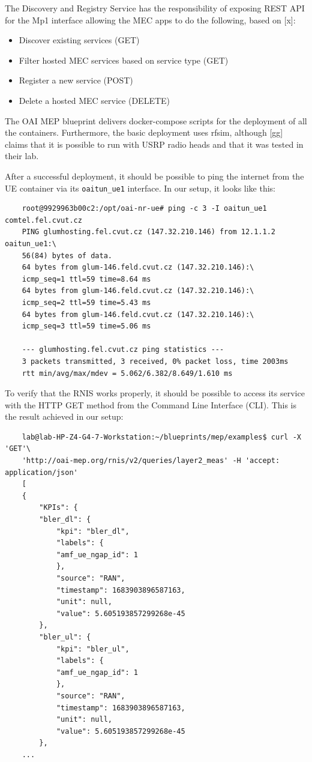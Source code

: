\documentclass[12pt,a4paper,twoside]{report}
\begin{document}
The Discovery and Registry Service has the responsibility of exposing REST API for the Mp1 interface allowing the MEC apps to do the following, based on [x]:
\begin{itemize}
	\item Discover existing services (GET)
	\item Filter hosted MEC services based on service type (GET)
	\item Register a new service (POST)
	\item Delete a hosted MEC service (DELETE)
\end{itemize}
The OAI MEP blueprint delivers docker-compose scripts for the deployment of all the containers. Furthermore, the basic deployment uses rfsim, although [gg] claims that it is possible to run with USRP radio heads and that it was tested in their lab. 

After a successful deployment, it should be possible to ping the internet from the UE container via its \verb |oaitun_ue1| interface. In our setup, it looks like this:
\begin{verbatim}
	root@9929963b00c2:/opt/oai-nr-ue# ping -c 3 -I oaitun_ue1 comtel.fel.cvut.cz
	PING glumhosting.fel.cvut.cz (147.32.210.146) from 12.1.1.2 oaitun_ue1:\
	56(84) bytes of data.
	64 bytes from glum-146.feld.cvut.cz (147.32.210.146):\
	icmp_seq=1 ttl=59 time=8.64 ms
	64 bytes from glum-146.feld.cvut.cz (147.32.210.146):\
	icmp_seq=2 ttl=59 time=5.43 ms
	64 bytes from glum-146.feld.cvut.cz (147.32.210.146):\
	icmp_seq=3 ttl=59 time=5.06 ms

	--- glumhosting.fel.cvut.cz ping statistics ---
	3 packets transmitted, 3 received, 0% packet loss, time 2003ms
	rtt min/avg/max/mdev = 5.062/6.382/8.649/1.610 ms
\end{verbatim}

To verify that the RNIS works properly, it should be possible to access its service with the HTTP GET method from the Command Line Interface (CLI). This is the result achieved in our setup:
\begin{verbatim}
	lab@lab-HP-Z4-G4-7-Workstation:~/blueprints/mep/examples$ curl -X 'GET'\
	'http://oai-mep.org/rnis/v2/queries/layer2_meas' -H 'accept: application/json'
	[
	{
		"KPIs": {
		"bler_dl": {
			"kpi": "bler_dl",
			"labels": {
			"amf_ue_ngap_id": 1
			},
			"source": "RAN",
			"timestamp": 1683903896587163,
			"unit": null,
			"value": 5.605193857299268e-45
		},
		"bler_ul": {
			"kpi": "bler_ul",
			"labels": {
			"amf_ue_ngap_id": 1
			},
			"source": "RAN",
			"timestamp": 1683903896587163,
			"unit": null,
			"value": 5.605193857299268e-45
		},
	...
\end{verbatim}
\end{document}
